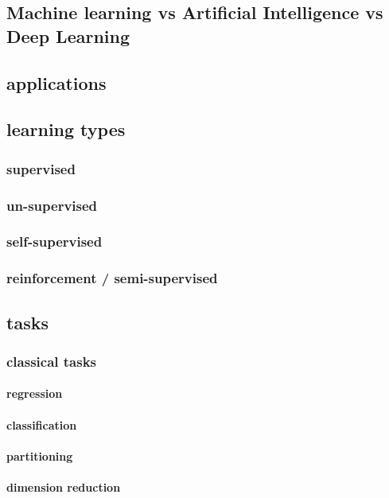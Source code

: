 \subsection{Machine learning vs Artificial Intelligence vs Deep Learning}

\subsection{applications}

\subsection{learning types}
\subsubsection{supervised}
\subsubsection{un-supervised}
\subsubsection{self-supervised}
\subsubsection{reinforcement / semi-supervised}

\subsection{tasks}
\subsubsection{classical tasks}
\paragraph{regression}
\paragraph{classification}
\paragraph{partitioning}
\paragraph{dimension reduction}
